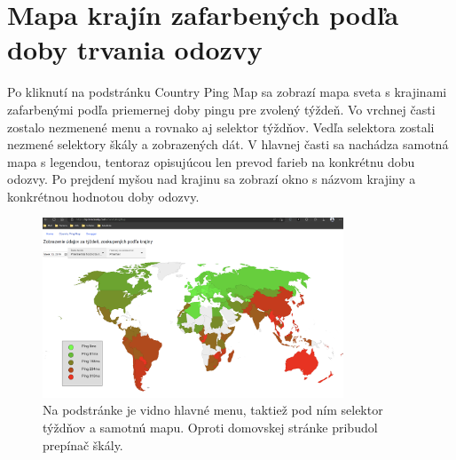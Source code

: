 \section*{Mapa krajín zafarbených podľa doby trvania odozvy}

Po kliknutí na podstránku Country Ping Map sa zobrazí mapa sveta s krajinami zafarbenými podľa priemernej doby pingu pre zvolený týždeň. Vo vrchnej časti 
zostalo nezmenené menu a rovnako aj selektor týždňov. Vedľa selektora zostali nezmené selektory škály a zobrazených dát. V hlavnej časti sa nachádza samotná mapa s legendou,
tentoraz opisujúcou len prevod farieb na konkrétnu 
dobu odozvy. Po prejdení myšou nad krajinu sa zobrazí okno s názvom krajiny a konkrétnou hodnotou doby odozvy.
\begin{figure}
    \centerline{\includegraphics[width=0.8\textwidth]{images/country-ping-info}}
    \caption[Mapa krajín zafarbených podľa priemernej doby odozvy]{Na podstránke je vidno hlavné menu, taktiež pod ním selektor týždňov a samotnú mapu. Oproti 
    domovskej stránke pribudol prepínač škály. }
    \label{obr:cpi}
\end{figure}